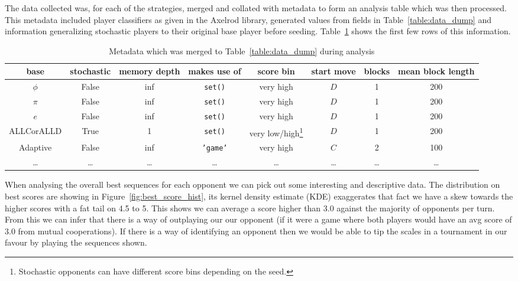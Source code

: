The data collected was, for each of the strategies, merged and collated with metadata to form an analysis table which was then processed.
This metadata included player classifiers as given in the Axelrod library, generated values from fields in Table~\ref{table:data_dump} and information generalizing stochastic players to their original base player before seeding.
Table~\ref{table:meta_data} shows the first few rows of this information.

\begin{table}[ht]
    \centering
    \begin{tabular}{cccccccc}
        \toprule
        base & stochastic & memory depth & makes use of & score bin & start move & blocks & mean block length\\
        \midrule
        $\phi$ & False & inf & \texttt{set()} & very high &  $D$ & 1 & 200\\

        $\pi$ & False & inf & \texttt{set()} & very high &  $D$ & 1 & 200\\

        $e$ & False & inf & \texttt{set()} & very high &  $D$ & 1 & 200\\

        ALLCorALLD & True & 1 & \texttt{set()} & very low/high\footnote{Stochastic opponents can have different score bins depending on the seed.} &  $D$ & 1 & 200\\

        Adaptive & False & inf & \texttt{'game'} & very high &  $C$ & 2 & 100\\

        \ldots & \ldots & \ldots & \ldots & \ldots & \ldots & \ldots & \ldots\\    
        \bottomrule
    \end{tabular}
    \caption{Metadata which was merged to Table~\ref{table:data_dump} during analysis}\label{table:meta_data}
\end{table}

When analysing the overall best sequences for each opponent we can pick out some interesting and descriptive data.
The distribution on best scores are showing in Figure~\ref{fig:best_score_hist}, its kernel density estimate (KDE) \cite{tukey1977exploratory} exaggerates that fact we have a skew towards the higher scores with a fat tail on 4.5 to 5.
This shows we can average a score higher than 3.0 against the majority of opponents per turn.
From this we can infer that there is a way of outplaying our our opponent (if it were a game where both players would have an avg score of $3.0$ from mutual cooperations).
If there is a way of identifying an opponent then we would be able to tip the scales in a tournament in our favour by playing the sequences shown.

